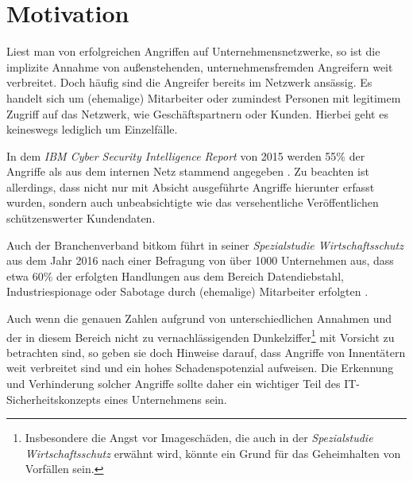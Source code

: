 \documentclass[
    fontsize=12pt,
    headings=small,
    parskip=half,           %
    bibliography=totoc,
    numbers=noenddot,       %
    open=any,               %
   final                   %
    ]{scrreprt}
\begin{document}
\section{Motivation}








Liest man von erfolgreichen Angriffen auf Unternehmensnetzwerke, so ist die implizite Annahme von außenstehenden, unternehmensfremden Angreifern weit verbreitet. Doch häufig sind die Angreifer bereits im Netzwerk ansässig. Es handelt sich um (ehemalige) Mitarbeiter oder zumindest Personen mit legitimem Zugriff auf das Netzwerk, wie Geschäftspartnern oder Kunden. Hierbei geht es keineswegs lediglich um Einzelfälle. 

In dem \textit{IBM Cyber Security Intelligence Report} von 2015 werden 55\% der Angriffe als aus dem internen Netz stammend angegeben \cite{ibm2015}. Zu beachten ist allerdings, dass nicht nur mit Absicht ausgeführte Angriffe hierunter erfasst wurden, sondern auch unbeabsichtigte wie das versehentliche Veröffentlichen schützenswerter Kundendaten.

Auch der Branchenverband bitkom führt in seiner \textit{Spezialstudie Wirtschaftsschutz} aus dem Jahr 2016 nach einer Befragung von über 1000 Unternehmen aus, dass etwa 60\% der erfolgten Handlungen aus dem Bereich Datendiebstahl, Industriespionage oder Sabotage durch (ehemalige) Mitarbeiter erfolgten \cite{bitkom2016}.


Auch wenn die genauen Zahlen aufgrund von unterschiedlichen Annahmen und der in diesem Bereich nicht zu vernachlässigenden Dunkelziffer\footnote{
	Insbesondere die Angst vor Imageschäden, die auch in der \textit{Spezialstudie Wirtschaftsschutz} erwähnt wird, könnte ein Grund für das Geheimhalten von Vorfällen sein.
} mit Vorsicht zu betrachten sind, so geben sie doch Hinweise darauf, dass Angriffe von Innentätern weit verbreitet sind und ein hohes Schadenspotenzial aufweisen. Die Erkennung und Verhinderung solcher Angriffe sollte daher ein wichtiger Teil des IT-Sicherheitskonzepts eines Unternehmens sein.
\end{document}
